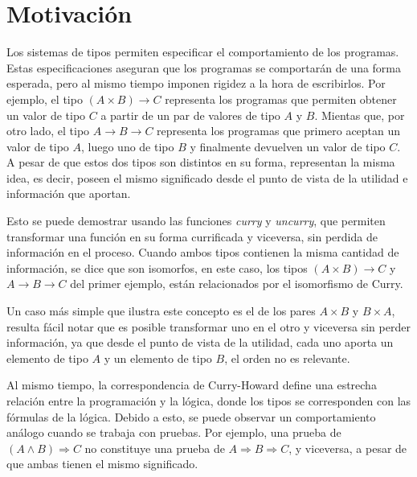 \section{Motivación}

Los sistemas de tipos permiten especificar el comportamiento de los programas.
Estas especificaciones aseguran que los programas se comportarán de una forma esperada, pero al mismo tiempo imponen rigidez a la hora de escribirlos.
Por ejemplo, el tipo $(A \times B) \rightarrow C$ representa los programas que permiten obtener un valor de tipo $C$ a partir de un par de valores de tipo $A$ y $B$.
Mientas que, por otro lado, el tipo $A \rightarrow B \rightarrow C$ representa los programas que primero aceptan un valor de tipo $A$, luego uno de tipo $B$ y finalmente devuelven un valor de tipo $C$.
A pesar de que estos dos tipos son distintos en su forma, representan la misma idea, es decir, poseen el mismo significado desde el punto de vista de la utilidad e información que aportan.

Esto se puede demostrar usando las funciones \textit{curry} y \textit{uncurry}, que permiten transformar una función en su forma currificada y viceversa, sin perdida de información en el proceso.
Cuando ambos tipos contienen la misma cantidad de información, se dice que son isomorfos, en este caso, los tipos $(A \times B) \rightarrow C$ y $A \rightarrow B \rightarrow C$ del primer ejemplo, están relacionados por el isomorfismo de Curry.

Un caso más simple que ilustra este concepto es el de los pares $A \times B$ y $B \times A$, resulta fácil notar que es posible transformar uno en el otro y viceversa sin perder información, ya que desde el punto de vista de la utilidad, cada uno aporta un elemento de tipo $A$ y un elemento de tipo $B$, el orden no es relevante.

Al mismo tiempo, la correspondencia de Curry-Howard \cite{sorensen2006lectures} define una estrecha relación entre la programación y la lógica, donde los tipos se corresponden con las fórmulas de la lógica.
Debido a esto, se puede observar un comportamiento análogo cuando se trabaja con pruebas.
Por ejemplo, una prueba de $(A \wedge B) \Rightarrow C$ no constituye una prueba de $A \Rightarrow B \Rightarrow C$, y viceversa, a pesar de que ambas tienen el mismo significado.

